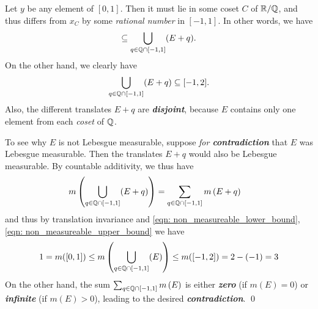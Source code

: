 \documentclass[11pt]{article}
\begin{document}
\begin{itemize}
\begin{example}
Let $y$ be any element of $[0, 1]$. Then it must lie in some coset $C$ of ${\mathbb R} / {\mathbb Q}$, and thus differs from $x_C$ by some \emph{rational number} in $[-1, 1]$. In other words, we have
\begin{align}
[0, 1] \subseteq  \bigcup_{q \in \bQ\cap [-1,1]}(E + q). \label{eqn: non_measureable_lower_bound}
\end{align} On the other hand, we clearly have
\begin{align}
\bigcup_{q \in {\mathbb Q}\cap [-1,1]}(E + q) \subseteq  [-1, 2]. \label{eqn: non_measureable_upper_bound}
\end{align} Also, the different translates $E + q$ are \emph{\textbf{disjoint}}, because $E$ contains only one element from each \emph{coset} of ${\mathbb Q}$.

To see why $E$ is not Lebesgue measurable, suppose \emph{for \textbf{contradiction}} that $E$ was Lebesgue measurable. Then the
translates $E + q$ would also be Lebesgue measurable. By countable additivity, we thus have
\begin{align*}
m\left(\bigcup_{q \in {\mathbb Q}\cap [-1,1]}(E + q)\right) &= \sum_{q \in {\mathbb Q}\cap [-1,1]} m\left(E + q\right)
\end{align*} and thus by translation invariance and \eqref{eqn: non_measureable_lower_bound}, \eqref{eqn: non_measureable_upper_bound} we have
\begin{align*}
1 = m([0, 1])   \le m\left(\bigcup_{q \in {\mathbb Q}\cap [-1,1]}(E)\right) \le m([-1, 2]) = 2-(-1) = 3
\end{align*} On the other hand, the sum $\sum_{q \in {\mathbb Q}\cap [-1,1]} m\left(E\right)$ is either \textbf{\emph{zero}} (if
$m(E) = 0$) or \textbf{\emph{infinite}} (if $m(E) > 0$), leading to the desired \emph{\textbf{contradiction}}. \qed
\end{example}
%
%
%

\end{itemize}
\end{document}
